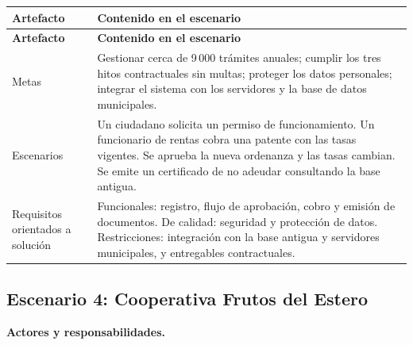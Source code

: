 {\small
\setlength{\tabcolsep}{4pt}
\renewcommand{\arraystretch}{1.3}
\begin{longtable}{
|>{\raggedright\arraybackslash}p{}
|>{\raggedright\arraybackslash}p{}|}
\hline
\textbf{Artefacto} & \textbf{Contenido en el escenario} \\
\hline
\endfirsthead
\hline
\textbf{Artefacto} & \textbf{Contenido en el escenario} \\
\hline
\endhead
Metas & Gestionar cerca de 9\,000 trámites anuales; cumplir los tres hitos contractuales sin multas; proteger los datos personales; integrar el sistema con los servidores y la base de datos municipales. \\
\hline
Escenarios & Un ciudadano solicita un permiso de funcionamiento. Un funcionario de rentas cobra una patente con las tasas vigentes. Se aprueba la nueva ordenanza y las tasas cambian. Se emite un certificado de no adeudar consultando la base antigua. \\
\hline
Requisitos orientados a solución & Funcionales: registro, flujo de aprobación, cobro y emisión de documentos. De calidad: seguridad y protección de datos. Restricciones: integración con la base antigua y servidores municipales, y entregables contractuales. \\
\hline
\end{longtable}
}

\subsection{Escenario 4: Cooperativa Frutos del Estero}

\textbf{Actores y responsabilidades.}

